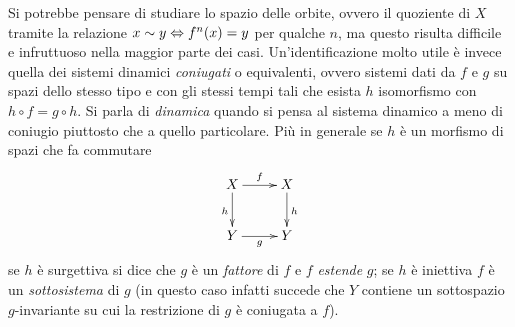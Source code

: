 Si potrebbe pensare di studiare lo spazio delle orbite, ovvero il quoziente di $X$ tramite
la relazione $x\sim y\Leftrightarrow f^n(x)=y$ per qualche $n$, 
ma questo risulta difficile e infruttuoso nella maggior parte dei casi. 
Un'identificazione molto utile è invece quella dei sistemi dinamici \emph{coniugati} o equivalenti, 
ovvero sistemi dati da $f$ e $g$ su spazi dello stesso tipo e con gli stessi tempi tali che esista $h$ isomorfismo con $h\circ f=g\circ h$. 
Si parla di \emph{dinamica} quando si pensa al sistema dinamico a meno di coniugio piuttosto che a quello particolare. 
Più in generale se $h$ è un morfismo di spazi che fa commutare
\[ \xymatrix{ X \ar[r]^f \ar[d]_h & X \ar[d]^h \\ Y \ar[r]_g & Y } \]
se $h$ è surgettiva si dice che $g$ è un \emph{fattore} di $f$ e $f$ \emph{estende} $g$; 
se $h$ è iniettiva $f$ è un \emph{sottosistema} di $g$ (in questo caso infatti succede che $Y$ contiene un sottospazio $g$-invariante su cui la restrizione di $g$ è coniugata a $f$). 


